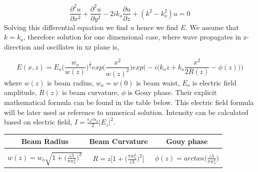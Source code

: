 \documentclass{article}
\begin{document}
	\begin{equation}
	\frac{\partial^2 u}{\partial x^2}+ \frac{\partial^2 u}{\partial y^2} - 2ik_o\frac{\partial u}{\partial z}+(k^2-k_o^2)u=0
	\end{equation}
	Solving this differential equation we find $u$ hence we find $E$. We assume that $k = k_o$, therefore solution for one dimensional case, where wave propagates in z-direction and oscillates in xz plane is,
	
	\[E(x,z)=E_o\bigg(\frac{w_o}{w(z)}\bigg)^{\frac{1}{2}}exp\bigg(\frac{x^2}{w(z)^2}\bigg)exp\bigg(-i\Big(k_oz+k_o\frac{x^2}{2R(z)}-\phi(z)\Big)\bigg)\]
	where $w(z)$ is beam radius, $w_o = w(0)$ is beam waist, $E_o$ is electric field amplitude, $R(z)$ is beam curvature, $\phi$ is Gouy phase. Their explicit mathematical formula can be found in the table below. This electric field formula will be later used as reference to numerical solution.
	Intensity can be calculated based on electric field, $I = \frac{\epsilon _o c n_o}{2}|E_z|^2$.
	

	\begin{table}[h!]
		\begin{center}
			\label{tab:table1}
			\begin{tabular}{c| c| c} %
				\textbf{Beam Radius} & \textbf{Beam Curvature} & \textbf{Gouy phase}\\
				\hline
				&&\\
				$w(z)= w_o\sqrt{1+\Big(\frac{z\lambda}{\pi w_o^2}\Big)^2}$ & $R=z\bigg[1+\Big(\frac{\pi w_o^2}{z\lambda}\Big)^2\bigg]$ & $\phi(z)=arctan\Big(\frac{z\lambda}{\pi w_o^2}\Big)$\\
			\end{tabular}
		\end{center}
	\end{table}
	
\end{document}
